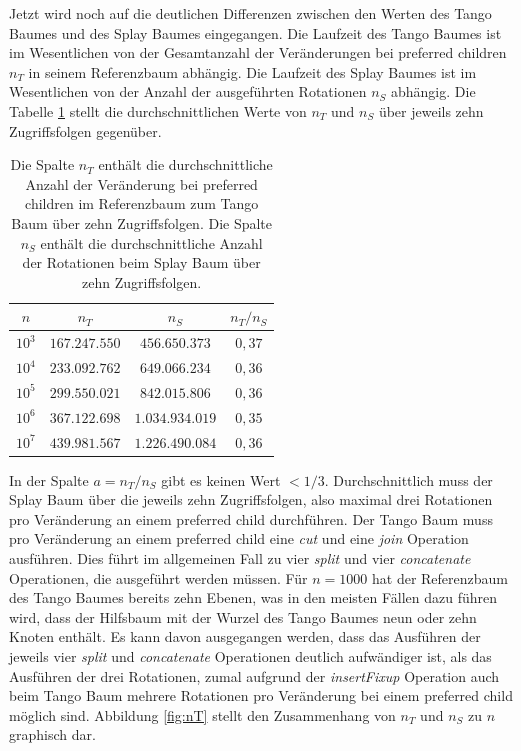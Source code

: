 \documentclass[a4paper,12pt]{article}
\begin{document}
Jetzt wird noch auf die deutlichen Differenzen zwischen den Werten des Tango Baumes und des Splay Baumes eingegangen. Die Laufzeit des Tango Baumes ist im Wesentlichen von der Gesamtanzahl der Veränderungen  bei preferred children $n_T$ in seinem Referenzbaum  abhängig. Die Laufzeit des Splay Baumes ist im Wesentlichen von der Anzahl der ausgeführten Rotationen $n_S$ abhängig. Die Tabelle \ref{tab:Ran} stellt die durchschnittlichen Werte von $n_T$ und $n_S$ über jeweils zehn Zugriffsfolgen gegenüber.    
\begin{table}[H] 
	\begin{center}
		\begin{tabular}	[c]{|c|c|c|c|}  
			\hline
			$n$ & $n_T$ & $n_S$ & $n_T / n_S$\\
			\hline
			$10^3$ & $167.247.550$ &$456.650.373$ &$0,37$\\
			\hline
			$10^4$  & $233.092.762$ &$649.066.234$&$0,36$  \\
			\hline
			$10^5$  & $299.550.021$ &$842.015.806$ & $0,36$\\
			\hline
			$10^6$  & $367.122.698$ &$1.034.934.019$ & $0,35$\\
			\hline
			$10^7$  & $439.981.567$ &$1.226.490.084$ & $0,36$\\
			\hline
		\end{tabular}
		\caption{Die Spalte $n_T$ enthält die durchschnittliche Anzahl der Veränderung bei preferred children im Referenzbaum zum Tango Baum über zehn Zugriffsfolgen. Die Spalte $n_S$ enthält die durchschnittliche Anzahl der Rotationen beim Splay Baum über zehn Zugriffsfolgen.   }  
		\label{tab:Ran}
	\end{center}
\end{table}
\noindent In der Spalte $a = n_T / n_S$ gibt es  keinen Wert $< 1/3$. Durchschnittlich muss der Splay Baum über die jeweils zehn Zugriffsfolgen, also maximal drei Rotationen pro Veränderung an einem preferred child durchführen. Der Tango Baum muss pro Veränderung an einem preferred child eine \textit{cut} und eine \textit{join} Operation ausführen. Dies führt im allgemeinen Fall zu vier \textit{split} und vier \textit{concatenate} Operationen,  die ausgeführt werden müssen. Für $n = 1000$ hat der Referenzbaum des Tango Baumes bereits zehn Ebenen, was in den meisten Fällen dazu führen wird, dass der Hilfsbaum mit der Wurzel des Tango Baumes neun oder zehn Knoten enthält. Es kann davon ausgegangen werden, dass das Ausführen der jeweils vier  \textit{split} und \textit{concatenate} Operationen deutlich aufwändiger ist, als das Ausführen der drei Rotationen, zumal aufgrund der \textit{insertFixup} Operation auch beim Tango Baum mehrere Rotationen pro Veränderung bei einem preferred child möglich sind. Abbildung \ref{fig:nT} stellt den Zusammenhang von $n_T$ und $n_S$ zu $n$ graphisch dar. 
\end{document}
